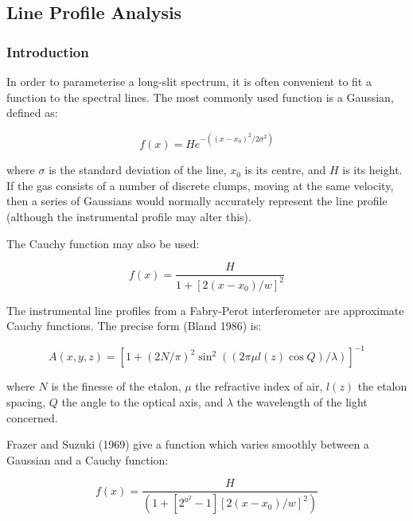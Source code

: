 \documentclass[11pt,twoside]{article}
\newcommand{\xlabel}[1]{}
\begin{document}
\subsection{\xlabel{line_profile_analysis}\label{line_profile_analysis}Line Profile Analysis}

\subsubsection{\xlabel{line_profile_analysis_introduction}Introduction}

In order to parameterise a long-slit spectrum, it is often
convenient to fit a function to the spectral lines.
The most commonly used function is a Gaussian, defined as:

\begin{equation}
     f(x) = H e^{-((x-x_{0})^{2}/2\sigma^{2})}
\end{equation}

where $\sigma$ is the standard deviation of the line, $x_{0}$ is its
centre, and $H$ is its height.
If the gas consists of a number of discrete clumps, moving at the same
velocity, then a series of Gaussians would normally accurately represent
the line profile (although the instrumental profile may alter this).

The Cauchy function may also be used:

\begin{equation}
     f(x) = \frac{H}{1+[2(x-x_{0})/w]^{2}}
\end{equation}

The instrumental line profiles from a Fabry-Perot interferometer are
approximate Cauchy functions.
The precise form (Bland 1986) is:

\begin{equation}
A(x,y,z) = [1+(2N/\pi )^{2}\sin^{2}((2\pi \mu l(z)\cos Q)/\lambda )]^{-1}
\end{equation}

where $N$ is the finesse of the etalon, $\mu$ the refractive index of
air, $l(z)$ the etalon spacing, $Q$ the angle to the optical axis, and
$\lambda$ the wavelength of the light concerned.

Frazer and Suzuki (1969) give a function which varies smoothly between a
Gaussian and a Cauchy function:

\begin{equation}
     f(x) = \frac{H}{(1+[2^{a^{2}}-1][2(x-x_{0})/w]^{2})}
\label{eq_varcauchy}
\end{equation}
\end{document}
